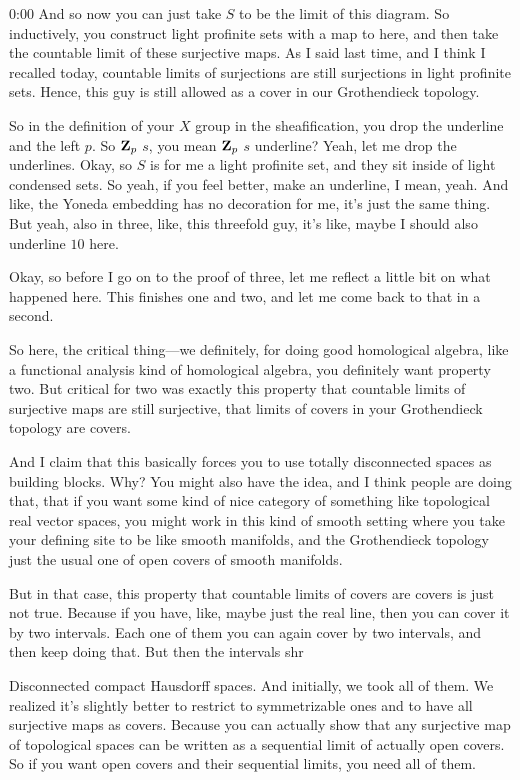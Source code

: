 \begin{unfinished}{0:00}
And so now you can just take $S$ to be the limit of this diagram. So inductively, you construct light profinite sets with a map to here, and then take the countable limit of these surjective maps. As I said last time, and I think I recalled today, countable limits of surjections are still surjections in light profinite sets. Hence, this guy is still allowed as a cover in our Grothendieck topology.

So in the definition of your $X$ group in the sheafification, you drop the underline and the left $p$. So $\mathbf Z_p$ $s$, you mean $\mathbf Z_p$ $s$ underline? Yeah, let me drop the underlines. Okay, so $S$ is for me a light profinite set, and they sit inside of light condensed sets. So yeah, if you feel better, make an underline, I mean, yeah. And like, the Yoneda embedding has no decoration for me, it's just the same thing. But yeah, also in three, like, this threefold guy, it's like, maybe I should also underline $10$ here.

Okay, so before I go on to the proof of three, let me reflect a little bit on what happened here. This finishes one and two, and let me come back to that in a second.

So here, the critical thing---we definitely, for doing good homological algebra, like a functional analysis kind of homological algebra, you definitely want property two. But critical for two was exactly this property that countable limits of surjective maps are still surjective, that limits of covers in your Grothendieck topology are covers.

And I claim that this basically forces you to use totally disconnected spaces as building blocks. Why? You might also have the idea, and I think people are doing that, that if you want some kind of nice category of something like topological real vector spaces, you might work in this kind of smooth setting where you take your defining site to be like smooth manifolds, and the Grothendieck topology just the usual one of open covers of smooth manifolds.

But in that case, this property that countable limits of covers are covers is just not true. Because if you have, like, maybe just the real line, then you can cover it by two intervals. Each one of them you can again cover by two intervals, and then keep doing that. But then the intervals shr

Disconnected compact Hausdorff spaces. And initially, we took all of them. We realized it's slightly better to restrict to symmetrizable ones and to have all surjective maps as covers. Because you can actually show that any surjective map of topological spaces can be written as a sequential limit of actually open covers. So if you want open covers and their sequential limits, you need all of them.


\end{unfinished}
